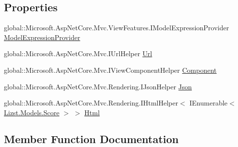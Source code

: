 \subsection*{Properties}
\begin{DoxyCompactItemize}
\item 
global\+::\+Microsoft.\+Asp\+Net\+Core.\+Mvc.\+View\+Features.\+I\+Model\+Expression\+Provider \mbox{\hyperlink{class_asp_net_core_1_1_views___score___index_a5e204f9cea9237150c336ec8c130fcb0}{Model\+Expression\+Provider}}
\item 
global\+::\+Microsoft.\+Asp\+Net\+Core.\+Mvc.\+I\+Url\+Helper \mbox{\hyperlink{class_asp_net_core_1_1_views___score___index_afbd529b0da1d92fe9dc75cb7b8308deb}{Url}}
\item 
global\+::\+Microsoft.\+Asp\+Net\+Core.\+Mvc.\+I\+View\+Component\+Helper \mbox{\hyperlink{class_asp_net_core_1_1_views___score___index_a8c3c5b05b6ec724b666e93b4148766d5}{Component}}
\item 
global\+::\+Microsoft.\+Asp\+Net\+Core.\+Mvc.\+Rendering.\+I\+Json\+Helper \mbox{\hyperlink{class_asp_net_core_1_1_views___score___index_a231adefb0789ad4cf79c7997d32a6531}{Json}}
\item 
global\+::\+Microsoft.\+Asp\+Net\+Core.\+Mvc.\+Rendering.\+I\+Html\+Helper$<$ I\+Enumerable$<$ \mbox{\hyperlink{class_lizst_1_1_models_1_1_score}{Lizst.\+Models.\+Score}} $>$ $>$ \mbox{\hyperlink{class_asp_net_core_1_1_views___score___index_a7e9ea8b2b224d1cd50aff4f3b87b0ac8}{Html}}
\end{DoxyCompactItemize}


\subsection{Member Function Documentation}
\mbox{\label{class_asp_net_core_1_1_views___score___index_a9f16a3d32b67377928388d02e95171de}} 
